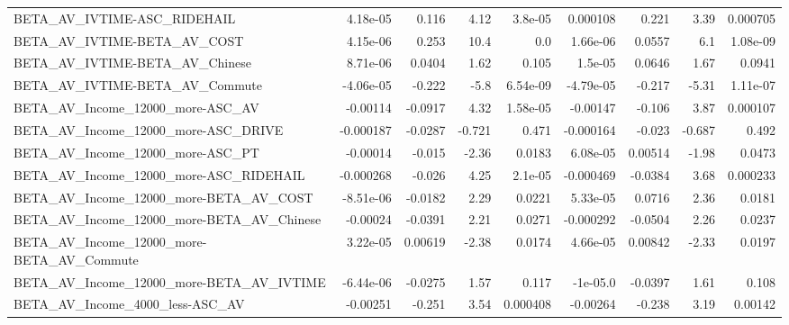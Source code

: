 \begin{tabular}{lrrrrrrrr}
BETA\_AV\_IVTIME-ASC\_RIDEHAIL                        &    4.18e-05 &        0.116 &     4.12 &  3.8e-05 &   0.000108 &       0.221 &         3.39 &      0.000705 \\
BETA\_AV\_IVTIME-BETA\_AV\_COST                        &    4.15e-06 &        0.253 &     10.4 &      0.0 &   1.66e-06 &      0.0557 &          6.1 &      1.08e-09 \\
BETA\_AV\_IVTIME-BETA\_AV\_Chinese                     &    8.71e-06 &       0.0404 &     1.62 &    0.105 &    1.5e-05 &      0.0646 &         1.67 &        0.0941 \\
BETA\_AV\_IVTIME-BETA\_AV\_Commute                     &   -4.06e-05 &       -0.222 &     -5.8 & 6.54e-09 &  -4.79e-05 &      -0.217 &        -5.31 &      1.11e-07 \\
BETA\_AV\_Income\_12000\_more-ASC\_AV                   &    -0.00114 &      -0.0917 &     4.32 & 1.58e-05 &   -0.00147 &      -0.106 &         3.87 &      0.000107 \\
BETA\_AV\_Income\_12000\_more-ASC\_DRIVE                &   -0.000187 &      -0.0287 &   -0.721 &    0.471 &  -0.000164 &      -0.023 &       -0.687 &         0.492 \\
BETA\_AV\_Income\_12000\_more-ASC\_PT                   &    -0.00014 &       -0.015 &    -2.36 &   0.0183 &   6.08e-05 &     0.00514 &        -1.98 &        0.0473 \\
BETA\_AV\_Income\_12000\_more-ASC\_RIDEHAIL             &   -0.000268 &       -0.026 &     4.25 &  2.1e-05 &  -0.000469 &     -0.0384 &         3.68 &      0.000233 \\
BETA\_AV\_Income\_12000\_more-BETA\_AV\_COST             &   -8.51e-06 &      -0.0182 &     2.29 &   0.0221 &   5.33e-05 &      0.0716 &         2.36 &        0.0181 \\
BETA\_AV\_Income\_12000\_more-BETA\_AV\_Chinese          &    -0.00024 &      -0.0391 &     2.21 &   0.0271 &  -0.000292 &     -0.0504 &         2.26 &        0.0237 \\
BETA\_AV\_Income\_12000\_more-BETA\_AV\_Commute          &    3.22e-05 &      0.00619 &    -2.38 &   0.0174 &   4.66e-05 &     0.00842 &        -2.33 &        0.0197 \\
BETA\_AV\_Income\_12000\_more-BETA\_AV\_IVTIME           &   -6.44e-06 &      -0.0275 &     1.57 &    0.117 &   -1e-05.0 &     -0.0397 &         1.61 &         0.108 \\
BETA\_AV\_Income\_4000\_less-ASC\_AV                    &    -0.00251 &       -0.251 &     3.54 & 0.000408 &   -0.00264 &      -0.238 &         3.19 &       0.00142 \\

\end{tabular}

